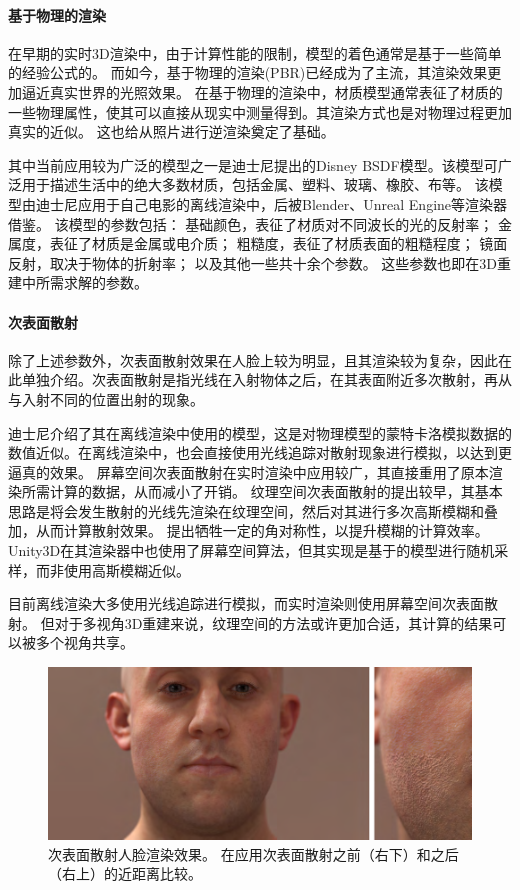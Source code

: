 \paragraph{基于物理的渲染}

在早期的实时3D渲染中，由于计算性能的限制，模型的着色通常是基于一些简单的经验公式的。
而如今，基于物理的渲染(PBR)已经成为了主流，其渲染效果更加逼近真实世界的光照效果。
在基于物理的渲染中，材质模型通常表征了材质的一些物理属性，使其可以直接从现实中测量得到。其渲染方式也是对物理过程更加真实的近似。
这也给从照片进行逆渲染奠定了基础。

其中当前应用较为广泛的模型之一是迪士尼提出的Disney BSDF模型\citep{PBR_disney}。该模型可广泛用于描述生活中的绝大多数材质，包括金属、塑料、玻璃、橡胶、布等。
该模型由迪士尼应用于自己电影的离线渲染中，后被Blender、Unreal Engine等渲染器借鉴。
该模型的参数包括：
基础颜色，表征了材质对不同波长的光的反射率；
金属度，表征了材质是金属或电介质；
粗糙度，表征了材质表面的粗糙程度；
镜面反射，取决于物体的折射率；
以及其他一些共十余个参数。
这些参数也即在3D重建中所需求解的参数。

\paragraph{次表面散射}
除了上述参数外，次表面散射效果在人脸上较为明显，且其渲染较为复杂，因此在此单独介绍。次表面散射是指光线在入射物体之后，在其表面附近多次散射，再从与入射不同的位置出射的现象。

迪士尼介绍了其在离线渲染中使用的模型\citep{SSS_disney}，这是对物理模型的蒙特卡洛模拟数据的数值近似。在离线渲染中，也会直接使用光线追踪对散射现象进行模拟，以达到更逼真的效果。
屏幕空间次表面散射\citep{SSSSS}在实时渲染中应用较广，其直接重用了原本渲染所需计算的数据，从而减小了开销。
纹理空间次表面散射\citep{texSSS}的提出较早，其基本思路是将会发生散射的光线先渲染在纹理空间，然后对其进行多次高斯模糊和叠加，从而计算散射效果。
\citet{SpSSS}提出牺牲一定的角对称性，以提升模糊的计算效率。
Unity3D在其渲染器中也使用了屏幕空间算法\citep{SSS_u3d}，但其实现是基于\citet{SSS_disney}的模型进行随机采样，而非使用高斯模糊近似。

目前离线渲染大多使用光线追踪进行模拟，而实时渲染则使用屏幕空间次表面散射。
但对于多视角3D重建来说，纹理空间的方法或许更加合适，其计算的结果可以被多个视角共享。

\begin{figure}
    \centering
    \includegraphics[width=\linewidth]{figures/sss}
    \caption[次表面散射人脸渲染效果]
    {次表面散射人脸渲染效果\citep{SpSSS}。
    在应用次表面散射之前（右下）和之后（右上）的近距离比较。}
\end{figure}

